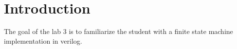 \section{Introduction}\label{sec: Introduction}
The goal of the lab 3 is to familiarize the student with a finite state machine implementation in verilog.